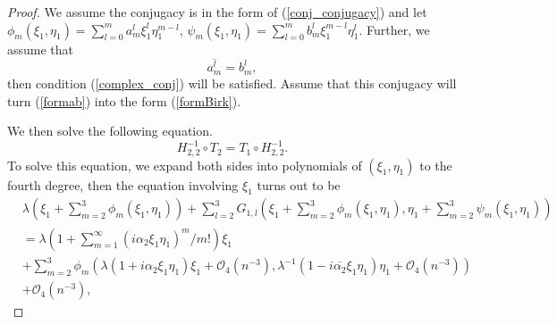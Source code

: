 \documentclass[10pt,a4paper]{amsart}
\begin{document}
\begin{proof}
We assume the conjugacy is in the form of (\ref{conj_conjugacy}) and let
\(\phi_{m}(\xi_1,\eta_1) = \sum_{l = 0}^{m}a_{m}^{l}\xi_1^{l}\eta_1^{m - l}\),
\(\psi_{m}(\xi_1,\eta_1) = \sum_{l = 0}^{m}b_{m}^{l}\xi_1^{m - l}\eta_1^{l}\). Further,  we assume that 
\begin{equation}\label{conj_relation}
\overline{a_{m}^{l}} = b_{m}^{l},
\end{equation}
then condition (\ref{complex_conj}) will be satisfied.
Assume that this conjugacy will turn (\ref{formab}) into the form (\ref{formBirk}).

 We then solve the following equation. 
\begin{equation}
	H_{2,2}^{-1}\circ T_2=T_1 \circ H_{2,2}^{-1}.
\end{equation}
To solve this equation, we expand both sides into polynomials of
\((\xi_1,\eta_1)\) to the fourth degree, then the equation involving \(\xi_1\) turns out to be
\begin{equation}\label{Birk_eq}
	\begin{split}
&\lambda\left( \xi_1 + \sum_{m = 2}^{3}{\phi_{m}(\xi_1,\eta_1)} \right) + \sum_{l = 2}^{3}G_{1,l} \left( \xi_1 + \sum_{m = 2}^{3}{\phi_{m}(\xi_1,\eta_1)},\eta_1 + \sum_{m = 2}^{3}{\psi_{m}(\xi_1,\eta_1)} \right)\\
 & = \lambda\left( 1 + \sum_{m=1}^{\infty}{\left(i\alpha_{2}\xi_1\eta_1\right)}^m/m!  \right)\xi_1  \\
 &+ \sum_{m = 2}^{3}{\phi_{m}\left( \lambda\left( 1 + i\alpha_{2}\xi_1\eta_1 \right)\xi_1 +\mathcal{O}_4(n^{-3}), \lambda^{- 1}\left( 1 - i\overline{\alpha_{2}}\xi_1\eta_1 \right)\eta_1 +\mathcal{O}_4(n^{-3}) \right)}\\
 &+\mathcal{O}_4(n^{-3}),
 \end{split}
\end{equation}


\end{proof}
\end{document}
